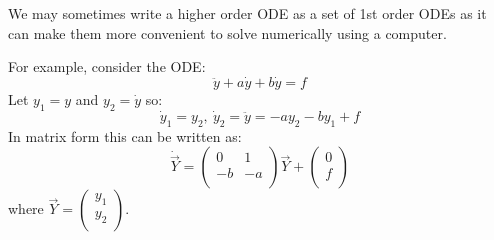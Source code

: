 \documentclass[../main.tex]{subfiles}
\begin{document}
\begin{remark}
  We may sometimes write a higher order ODE as a set of 1st order ODEs as it can make them more convenient to solve numerically using a computer.

  For example, consider the ODE:
  \[
    \ddot{y} + a\dot{y} + b\dot{y} = f
  \]
  Let $y_1 = y$ and $y_2 = \dot{y}$ so:
  \[
    \dot{y}_1 = y_2,\ \dot{y}_2 = \ddot{y} = -ay_2 -by_1 + f
  \]
  In matrix form this can be written as:
  \[
    \dot{\vec{Y}} = \begin{pmatrix}
    0 & 1 \\
    -b & -a \\
    \end{pmatrix} \vec{Y} +
    \begin{pmatrix}
    0 \\
    f \\
    \end{pmatrix}
  \]
  where $\vec{Y} = \begin{pmatrix}
    y_1 \\
    y_2 \\
    \end{pmatrix}$.
\end{remark}
\end{document}
